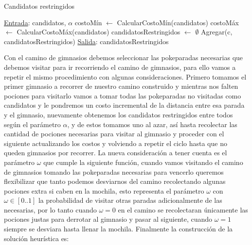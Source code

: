 \begin{algorithm}[H]

\label{}
\caption{Candidatos restringidos}

\begin{algorithmic}[1]

\Statex \underline{Entrada}: candidatos, $\alpha$
\medskip
\State costoM\'in $\gets$ CalcularCostoM\'in(candidatos)
\State costoM\'ax $\gets$ CalcularCostoM\'ax(candidatos)
\State candidatosRestringidos $\gets$ $\emptyset$
		\State Agregar(c, candidatosRestringidos)
	\EndIf
\EndFor
\medskip
\Statex \underline{Salida}: candidatosRestringidos

\end{algorithmic}
\end{algorithm}

Con el camino de gimnasios debemos seleccionar las pokeparadas necesarias que debemos visitar para ir recorriendo el camino de gimnasios, para ello vamos a repetir el mismo procedimiento con algunas consideraciones. Primero tomamos el primer gimnasio a recorrer de nuestro camino construido y mientras nos falten pociones para visitarlo vamos a tomar todas las pokeparadas no visitadas como candidatos y le pondremos un costo incremental de la distancia entre esa parada y el gimnasio, nuevamente obtenemos los candidatos restringidos entre todos según el parámetro $\alpha$, y de estos tomamos uno al azar, así hasta recolectar las cantidad de pociones necesarias para visitar al gimnasio y proceder con el siguiente actualizando los costos y volviendo a repetir el ciclo hasta que no queden gimnasios por recorrer. La nueva consideración a tener cuenta es el parámetro $\omega$ que cumple la siguiente función, cuando vamos visitando el camino de gimnasios tomando las pokeparadas necesarias para vencerlo queremos flexibilizar que tanto podemos desviarnos del camino recolectando algunas pociones extra si caben en la mochila, esto representa el parámetro $\omega$ con $\omega \in [0..1]$ la probabilidad de visitar otras paradas adicionalmente de las necesarias, por lo tanto cuando $\omega = 0$ en el camino se recolectaran únicamente las pociones justas para derrotar al gimnasio y pasar al siguiente, cuando $\omega = 1$ siempre se desviara hasta llenar la mochila. Finalmente la construcción de la solución heurística es:

